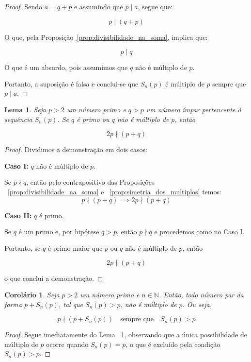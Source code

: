 \documentclass[a4paper,11pt]{article}
\newtheorem{lemma}[theorem]{Lema}
\newtheorem{corollary}[theorem]{Corolário}
\theoremstyle{definition}
\theoremstyle{remark}
\begin{document}
\begin{otherlanguage}{brazil}
\begin{proof}
		Sendo \(a = q + p\) e assumindo que \(p \mid a\), segue que:
		
		\[
		p \mid (q + p)
		\]
		
		O que, pela Proposição~\ref{prop:divisibilidade_na_soma}, implica que:
		
		\[
		p \mid q
		\]
		
		O que é um absurdo, pois assumimos que \(q\) não é múltiplo de \(p\).
		
		Portanto, a suposição é falsa e conclui-se que \(S_n(p)\) é múltiplo de \(p\) sempre que \(p \mid a\).
	\end{proof}
	
	\begin{lemma}\label{lema:multip}
		Seja \(p > 2\) um número primo e \(q > p\) um número ímpar pertencente à sequência \(S_n(p)\). Se \(q\) é primo ou \(q\) não é múltiplo de \(p\), então
		
		\[
		2p \nmid (p + q)
		\]
	\end{lemma}
	\begin{proof}
		Dividimos a demonstração em dois casos:
		
		\textbf{Caso I:} \(q\) não é múltiplo de \(p\).
		
		Se \(p \nmid q \), então pelo contrapositivo das  Proposições ~\ref{prop:divisibilidade_na_soma} e ~\ref{prop:simetria_dos_multiplos} temos:
		\[
		 p \nmid (p + q) \implies 2p \nmid (p + q)
		\] 
		
		\textbf{Caso II:} \(q\) é primo.
		
		Se \(q\) é um primo e, por hipótese \(q > p\), então \(p \nmid q \) e procedemos como no Caso I.
		
		Portanto, se \(q\) é primo maior que \(p\) ou \(q\) não é múltiplo de \(p\), então 
		
		\[
		2p \nmid (p + q)
		\]
		
		o que conclui a demonstração.
		
	\end{proof}
	
	\begin{corollary}
		Seja \(p > 2\) um número primo e \(n \in \mathbb{N}\). Então, todo número par da forma \(p + S_n(p)\), tal que \(S_n(p) > p\), não é múltiplo de \(p\). Ou seja,
		
		\[
		p \nmid (p + S_n(p)) \quad \text{sempre que} \quad S_n(p) > p
		\]
		
	\end{corollary}
	
	\begin{proof}
		Segue imediatamente do Lema ~\ref{lema:multip}, observando que a única possibilidade de múltiplo de \(p\) ocorre quando \(S_n(p) = p\), o que é excluído pela condição \(S_n(p) > p\).
	\end{proof}
	

\end{otherlanguage}
\end{document}
